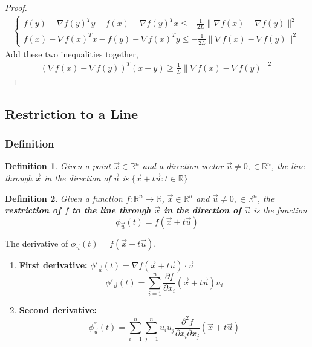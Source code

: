 \documentclass[11pt,a4paper]{article}
\newtheorem{definition}{Definition}
\begin{document}
\begin{proof}
\begin{equation}
    \begin{aligned}
        \left\{\begin{matrix}
            f(y)-\nabla f(y)^Ty-f(x)-\nabla f(y)^Tx\leq -\frac{1}{2L}\|\nabla f(x)-\nabla f(y)\|^2\\
            f(x)-\nabla f(x)^Tx-f(y)-\nabla f(x)^Ty\leq -\frac{1}{2L}\|\nabla f(x)-\nabla f(y)\|^2
        \end{matrix}\right.
    \end{aligned}
    \nonumber
\end{equation}
Add these two inequalities together,
\begin{equation}
    \begin{aligned}
        (\nabla f(x)-\nabla f(y))^T(x-y)\geq \frac{1}{L}\|\nabla f(x)-\nabla f(y)\|^2
    \end{aligned}
    \nonumber
\end{equation}
\end{proof}

\subsection{Restriction to a Line}
\subsubsection{Definition}
\begin{definition}
    Given a point $\vec{x}\in \mathbb{R}^n$ and a direction vector $\vec{u}\neq 0, \in \mathbb{R}^n$, the line through $\vec{x}$ in the direction of $\vec{u}$ is $\{\vec{x}+t \vec{u}: t\in \mathbb{R}\}$
\end{definition}

\begin{definition}
    Given a function $f: \mathbb{R}^n \rightarrow \mathbb{R}$, $\vec{x}\in \mathbb{R}^n$ and $\vec{u}\neq 0, \in \mathbb{R}^n$, the \textbf{restriction of $f$ to the line through $\vec{x}$ in the direction of $\vec{u}$} is the function $$\phi_{\vec{u}}(t)=f(\vec{x}+t\vec{u})$$
\end{definition}
The derivative of $\phi_{\vec{u}}(t)=f(\vec{x}+t\vec{u})$,
\begin{enumerate}
    \item \textbf{First derivative:} $\phi'_{\vec{u}}(t)=\nabla f(\vec{x}+t\vec{u})\cdot \vec{u}$ $$\phi'_{\vec{u}}(t)=\sum_{i=1}^n \frac{\partial f}{\partial x_i}(\vec{x}+t\vec{u})u_i$$
    \item \textbf{Second derivative:} $$\phi^{''}_{\vec{u}} (t)=\sum_{i=1}^n \sum_{j=1}^n u_iu_j\frac{\partial^2 f}{\partial x_i\partial x_j}(\vec{x}+t\vec{u})$$
\end{enumerate}
\end{document}
